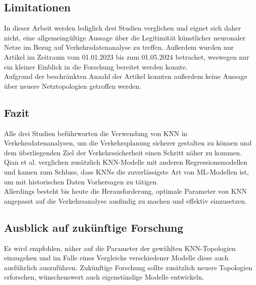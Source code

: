 \documentclass{scrartcl}
\begin{document}
\subsection{Limitationen}

In dieser Arbeit werden lediglich drei Studien verglichen und eignet sich daher
nicht, eine allgemeingültige Aussage über die Legitimität künstlicher neuronaler
Netze im Bezug auf Verkehrsdatenanalyse zu treffen. Außerdem wurden nur
Artikel im Zeitraum vom 01.01.2023 bis zum 01.05.2024 betrachet, weswegen nur ein 
kleiner Einblick in die Forschung bereitet werden konnte.
\medskip \\
Aufgrund der beschränkten Anzahl der Artikel konnten außerdem keine Aussage
über neuere Netztopologien getroffen werden.

\subsection{Fazit}

Alle drei Studien beführworten die Verwendung von KNN in
Verkehrsdatenanalysen, um die Verkehrsplanung sicherer gestalten zu können
und dem überliegenden Ziel der Verkehrssicherheit einen Schritt näher zu kommen.
Qian et al. verglichen zusätzlich KNN-Modelle mit anderen
Regressionsmodellen und kamen zum Schluss, dass KNNs die zuverlässigste
Art von ML-Modellen ist, um mit historischen Daten Vorhersagen zu tätigen.
\medskip \\
Allerdings besteht bis heute die Herausforderung, optimale Parameter von
KNN angepasst auf die Verkehrsanalyse ausfindig zu machen und effektiv einzusetzen.

\subsection{Ausblick auf zukünftige Forschung}

Es wird empfohlen, näher auf die Parameter der gewählten KNN-Topologien
einzugehen und im Falle eines Vergleichs verschiedener Modelle diese auch
ausführlich auszuführen. Zukünftige Forschung sollte zusätzlich neuere
Topologien erforschen, wünschenswert auch eigenständige Modelle entwickeln.

\printbibliography
\listoffigures
\listoftables
\end{document}
